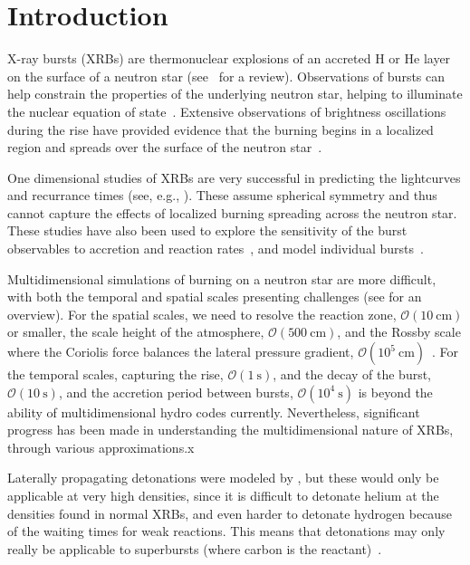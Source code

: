 \documentclass[preprint,times,tighten]{aastex63}
\newcommand{\AssignTo}[1]{
    \marginpar{\vskip-\baselineskip%
               \raggedright%
               \tiny\sffamily%
               {\color{blue}\hrule%
               \smallskip%
               #1\par%
               \smallskip%
               \hrule}}%
}
\begin{document}
\section{Introduction}\label{Sec:Introduction}

\AssignTo{Mike, Alice}

X-ray bursts (XRBs) are thermonuclear explosions of an accreted H or
He layer on the surface of a neutron star (see~\citealt{galloway:2017}
for a review).  Observations of bursts can help constrain the
properties of the underlying neutron star, helping to illuminate the
nuclear equation of state~\citep{steiner:2010,ozel:2010}.  Extensive
observations of brightness oscillations during the rise have provided
evidence that the burning begins in a localized region and spreads
over the surface of the neutron
star~\citep{bhattacharyya:2006,bhattacharyya:2007,chakraborty:2014}.

One dimensional studies of XRBs are very successful in predicting the
lightcurves and recurrance times (see, e.g., \citealt{woosley-xrb}).
These assume spherical symmetry and thus cannot capture the effects of
localized burning spreading across the neutron star.  These studies
have also been used to explore the sensitivity of the burst
observables to accretion and reaction
rates~\citep{cyburt:2010,Jose2010a,Lampe2016}, and model individual
bursts~\citep{johnston:2019}.

Multidimensional simulations of burning on a neutron star are more
difficult, with both the temporal and spatial scales presenting
challenges (see \citealt{astronum_2018} for an overview).  For the spatial scales, we need to
resolve the reaction zone, $\mathcal{O}(10~\mbox{cm})$ or smaller, the
scale height of the atmosphere, $\mathcal{O}(500~\mbox{cm})$, and the
Rossby scale where the Coriolis force balances the lateral pressure
gradient, $\mathcal{O}(10^5~\mbox{cm})$~\citep{spitkovsky2002}.  For
the temporal scales, capturing the rise, $\mathcal{O}(1~\mbox{s})$,
and the decay of the burst, $\mathcal{O}(10~\mbox{s})$, and the
accretion period between bursts, $\mathcal{O}(10^4~\mbox{s})$ is
beyond the ability of multidimensional hydro codes currently.
Nevertheless, significant progress has been made in understanding the
multidimensional nature of XRBs, through various approximations.x

Laterally propagating detonations were modeled by
\citet{fryxellwoosley82,hedet}, but these would only be applicable at
very high densities, since it is difficult to detonate helium at the
densities found in normal XRBs, and even harder to detonate hydrogen
because of the waiting times for weak reactions.  This means that
detonations may only really be applicable to superbursts (where carbon
is the reactant)~\citep{Weinberg2006b,Weinberg2007}.
\end{document}
